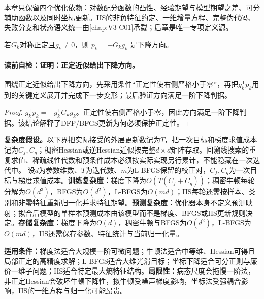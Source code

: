 \begin{keypointbox}[title=IIS专项接口预告（不在本章重复算法）]
本章只保留四个优化依赖：对数配分函数的凸性、经验期望与模型期望之差、可分辅助函数以及同时坐标更新。IIS的非负特征约定、一维增量方程、完整伪代码、失败分支和状态语义统一由\cref{chap:V3-C01}承载；后章是唯一专项定义源。
\end{keypointbox}


\label{struct:V1-C08-CH13}
\begin{lemma}[正定近似给出下降方向]
若$G_k$对称正定且$g_k\ne0$，则 $p_k=-G_kg_k$ 是下降方向。
\end{lemma}
\paragraph{读前自检：证明：正定近似给出下降方向。}围绕正定近似给出下降方向，先采用条件“正定性使右侧严格小于零”，再把$g_k^{\mathsf T}p_k$用到的关键定义展开并完成下一步变形；最后验证方向满足一阶下降判据。\par

\begin{proof}
$g_k^{\mathsf T}p_k=-g_k^{\mathsf T}G_kg_k$。正定性使右侧严格小于零，因此方向满足一阶下降判据。该结论解释了DFP/BFGS更新为何必须保护正定性。
\end{proof}

\label{struct:V1-C08-CH28}
\label{struct:V1-C08-CH29}
\begin{complexitybox}
\textbf{复杂度假设。}以下界把实际接受的外层更新数记为$T$，把一次目标和梯度求值成本记为$C_f,C_g$；稠密Hessian或逆Hessian近似按完整$d\times d$矩阵存取。回溯线搜索的重复求值、稀疏线性代数和预条件成本必须按实际实现另行累计，不能隐藏在一次迭代中。
设$d$为参数维数、$T$为迭代数、$m$为L-BFGS保留的校正对，$C_f,C_g$为一次目标与梯度求值成本。\textbf{训练复杂度：}梯度下降为$O(T(C_f+C_g))$；稠密牛顿每轮分解为$O(d^3)$，BFGS为$O(d^2)$，L-BFGS为$O(md)$；IIS每轮还需按样本、类别和非零特征重新归一化并求特征期望。\textbf{预测复杂度：}优化器本身不定义预测映射；拟合后模型的单样本预测成本由该模型而不是梯度、BFGS或IIS更新规则决定。\textbf{存储复杂度：}梯度下降为$O(d)$，稠密牛顿与BFGS为$O(d^2)$，L-BFGS为$O(md)$，IIS还需保存参数、特征统计与当前归一化量。
\end{complexitybox}

\label{struct:V1-C08-CH30}
\label{struct:V1-C08-CH31}
\begin{applicabilitybox}
\textbf{适用条件：}梯度法适合大规模一阶可微问题；牛顿法适合中等维、Hessian可得且局部正定的高精度求解；L-BFGS适合大维光滑目标；坐标下降适合可分正则与廉价一维子问题；IIS适合特定最大熵特征结构。\textbf{局限性：}病态尺度会拖慢一阶法，非正定Hessian会破坏牛顿下降性，拟牛顿受噪声梯度影响，坐标法受强耦合影响，IIS的一维方程与归一化可能昂贵。
\end{applicabilitybox}

